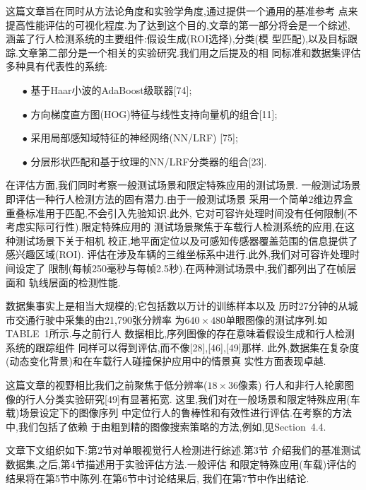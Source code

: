 这篇文章旨在同时从方法论角度和实验学角度,通过提供一个通用的基准参考
点来提高性能评估的可视化程度.为了达到这个目的,文章的第一部分将会是一个综述,
涵盖了行人检测系统的主要组件:假设生成(ROI选择),分类(模
型匹配),以及目标跟踪.文章第二部分是一个相关的实验研究.我们用之后提及的相
同标准和数据集评估多种具有代表性的系统:
\begin{enumerate}
    \item[$\bullet$]基于Haar小波的AdaBoost级联器[74];
    \item[$\bullet$]方向梯度直方图(HOG)特征与线性支持向量机的组合[11];
    \item[$\bullet$]采用局部感知域特征的神经网络(NN/LRF) [75]; 
    \item[$\bullet$]分层形状匹配和基于纹理的NN/LRF分类器的组合[23].
\end{enumerate}

在评估方面,我们同时考察一般测试场景和限定特殊应用的测试场景.
一般测试场景即评估一种行人检测方法的固有潜力.由于一般测试场景
采用一个简单2维边界盒重叠标准用于匹配,不会引入先验知识.此外,
它对可容许处理时间没有任何限制(不考虑实际可行性).限定特殊应用的
测试场景聚焦于车载行人检测系统的应用,在这种测试场景下关于相机
校正,地平面定位以及可感知传感器覆盖范围的信息提供了感兴趣区域(ROI).
评估在涉及车辆的三维坐标系中进行.此外,我们对可容许处理时间设定了
限制(每帧250毫秒与每帧2.5秒).在两种测试场景中,我们都列出了在帧层面和
轨线层面的检测性能.

数据集事实上是相当大规模的;它包括数以万计的训练样本以及
历时27分钟的从城市交通行驶中采集的由21,790张分辨率
为$640\times480$单眼图像的测试序列.如TABLE~1所示.与之前行人
数据相比,序列图像的存在意味着假设生成和行人检测系统的跟踪组件
同样可以得到评估,而不像[28],[46],[49]那样.
此外,数据集在复杂度(动态变化背景)和在车载行人碰撞保护应用中的情景真
实性方面表现卓越.

这篇文章的视野相比我们之前聚焦于低分辨率($18\times36像素$)
行人和非行人轮廓图像的行人分类实验研究[49]有显著拓宽.
这里,我们对在一般场景和限定特殊应用(车载)场景设定下的图像序列
中定位行人的鲁棒性和有效性进行评估.在考察的方法中,我们包括了依赖
于由粗到精的图像搜索策略的方法,例如,见Section~4.4.

文章下文组织如下:第2节对单眼视觉行人检测进行综述.第3节
介绍我们的基准测试数据集,之后,第4节描述用于实验评估方法.一般评估
和限定特殊应用(车载)评估的结果将在第5节中陈列.在第6节中讨论结果后,
我们在第7节中作出结论.

